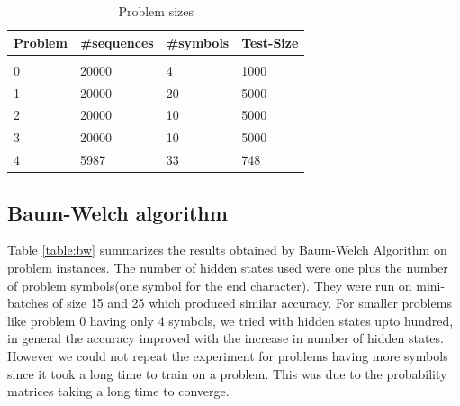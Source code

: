 \documentclass[letterpaper]{article}
\begin{document}
\begin{table}[h]
	\caption{Problem sizes}
	\label{table:prob}
	\begin{center}
		\begin{tabular}{llll}
			\multicolumn{1}{c}{\bf Problem} & \multicolumn{1}{c}{\bf \#sequences} & \multicolumn{1}{c}{\bf \#symbols} & \multicolumn{1}{c}{\bf Test-Size} \\
			\hline \\
			0                               & 20000                               & 4                                 & 1000                              \\
			1                               & 20000                               & 20                                & 5000                              \\
			2                               & 20000                               & 10                                & 5000                              \\
			3                               & 20000                               & 10                                & 5000                              \\
			4                               & 5987                                & 33                                & 748                               \\
		\end{tabular}
	\end{center}
\end{table}

\subsection{Baum-Welch algorithm}
Table \ref{table:bw} summarizes the results obtained by Baum-Welch Algorithm on problem instances. The number of hidden states used were one plus the number of problem symbols(one symbol for the end character). They were run on mini-batches of size 15 and 25 which produced similar accuracy. For smaller problems like problem 0 having only 4 symbols, we tried with hidden states upto hundred, in general the accuracy improved with the increase in number of hidden states. However we could not repeat the experiment for problems having more symbols since it took a long time to train on a problem. This was due to the probability matrices taking a long time to converge. 
\end{document}
